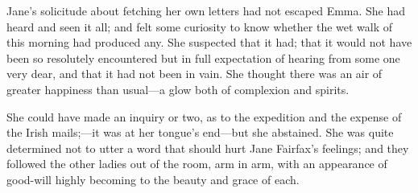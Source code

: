 Jane's solicitude about fetching her own letters had not escaped Emma. She had heard and seen it all; and felt some curiosity to know whether the wet walk of this morning had produced any. She suspected that it had; that it would not have been so resolutely encountered but in full expectation of hearing from some one very dear, and that it had not been in vain. She thought there was an air of greater happiness than usual—a glow both of complexion and spirits.

She could have made an inquiry or two, as to the expedition and the expense of the Irish mails;—it was at her tongue's end—but she abstained. She was quite determined not to utter a word that should hurt Jane Fairfax's feelings; and they followed the other ladies out of the room, arm in arm, with an appearance of good-will highly becoming to the beauty and grace of each.